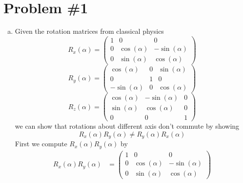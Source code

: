 \documentclass[11pt]{article}
\numberwithin{equation}{section}
\begin{document}


\section{Problem \#1}
\begin{enumerate}[(a)]
\item
Given the rotation matrices from classical physics
\begin{equation}\label{Rotx}
R_x(\alpha) = \left(\begin{array}{ccc}
                    1    &0               &0    \\
                    0    &\cos(\alpha)    &-\sin(\alpha) \\
                    0    &\sin(\alpha)    &\cos(\alpha) 
                    \end{array}\right)
\end{equation}
\begin{equation}\label{Roty}
R_y(\alpha) = \left(\begin{array}{ccc}
                    \cos(\alpha)    &0    &\sin(\alpha) \\
                    0                &1    &0            \\
                    -\sin(\alpha)    &0   &\cos(\alpha) 
                    \end{array}\right)
\end{equation}
\begin{equation}\label{Rotz}
R_z(\alpha) = \left(\begin{array}{ccc}
                    \cos(\alpha)    &-\sin(\alpha)    &0  \\
                    \sin(\alpha)    &\cos(\alpha)    &0  \\
                    0               &0               &1  
                    \end{array}\right)
\end{equation}
we can show that rotations about different axis don't commute by showing
$$R_x(\alpha)R_y(\alpha) \ne R_y(\alpha)R_x(\alpha)$$
First we compute $R_x(\alpha)R_y(\alpha)$ by
\begin{align*}
R_x(\alpha)R_y(\alpha) &= 
\left(\begin{array}{ccc}
      1    &0               &0    \\
      0    &\cos(\alpha)    &-\sin(\alpha) \\
      0    &\sin(\alpha)    &\cos(\alpha) 
      \end{array}\right)

\end{align*}
\end{enumerate}
\end{document}
